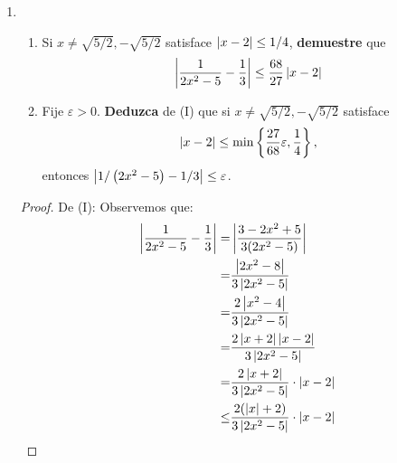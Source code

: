 \documentclass[12pt]{article}
\begin{document}
\begin{enumerate}
\begin{proof}
\begin{equation*}
        \end{equation*}
        Además, $\abs{x-y}\leq\frac{y^{3/2}}{2}\varepsilon$. Por tanto:
        \begin{equation*}
            \begin{split}
                \abs{\frac{1}{\sqrt{x}}-\frac{1}{\sqrt{y}}}\leq&\frac{2\abs{x-y}}{y^{3/2}}\\
                \leq&\frac{2}{y^{3/2}}\cdot\frac{y^{3/2}}{2}\varepsilon\\
                =&\varepsilon\\
                \Rightarrow\abs{\frac{1}{\sqrt{x}}-\frac{1}{\sqrt{y}}}\leq&\varepsilon
            \end{split}
        \end{equation*}
        \qed
    \end{proof}
    \item \begin{enumerate}
        \item Si $x\neq\sqrt{5/2},-\sqrt{5/2}$ satisface $\left| x-2 \right|\leq1/4$, \textbf{demuestre} que
        \begin{equation*}
            \left| \frac{1}{2x^2-5}-\frac{1}{3} \right|\leq\frac{68}{27}\left| x-2 \right|
        \end{equation*}
        \item Fije $\varepsilon>0$. \textbf{Deduzca} de (I) que si $x\neq\sqrt{5/2},-\sqrt{5/2}$ satisface
        \begin{equation*}
            \left| x-2 \right|\leq\min\left\{\frac{27}{68}\varepsilon,\frac{1}{4}\right\},
        \end{equation*}
        entonces $\left| 1/\left(2x^2-5\right)-1/3 \right|\leq\varepsilon$.
    \end{enumerate}
    \begin{proof}
        De (I): Observemos que:
        \begin{equation*}
            \begin{split}
                \abs{\frac{1}{2x^2-5}-\frac{1}{3}}=&\abs{\frac{3-2x^2+5}{3(2x^2-5)}}\\
                =&\frac{\abs{2x^2-8}}{3\abs{2x^2-5}}\\
                =&\frac{2\abs{x^2-4}}{3\abs{2x^2-5}}\\
                =&\frac{2\abs{x+2}\abs{x-2}}{3\abs{2x^2-5}}\\
                =&\frac{2\abs{x+2}}{3\abs{2x^2-5}}\cdot\abs{x-2}\\
                \leq&\frac{2(\abs{x}+2)}{3\abs{2x^2-5}}\cdot\abs{x-2}

\end{split}
\end{equation*}
\end{proof}
\end{enumerate}
\end{document}
